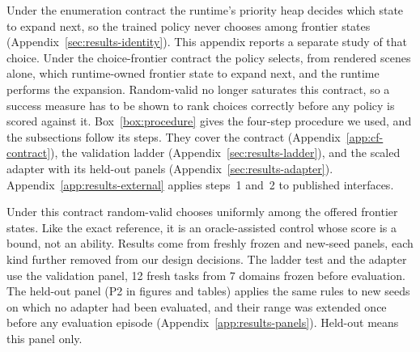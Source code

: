 Under the enumeration contract the runtime's priority heap decides which state to expand next, so the trained policy never chooses among frontier states (Appendix~\ref{sec:results-identity}). This appendix reports a separate study of that choice. Under the choice-frontier contract the policy selects, from rendered scenes alone, which runtime-owned frontier state to expand next, and the runtime performs the expansion. Random-valid no longer saturates this contract, so a success measure has to be shown to rank choices correctly before any policy is scored against it. Box~\ref{box:procedure} gives the four-step procedure we used, and the subsections follow its steps. They cover the contract (Appendix~\ref{app:cf-contract}), the validation ladder (Appendix~\ref{sec:results-ladder}), and the scaled adapter with its held-out panels (Appendix~\ref{sec:results-adapter}). Appendix~\ref{app:results-external} applies steps~1 and~2 to published interfaces.

Under this contract random-valid chooses uniformly among the offered frontier states. Like the exact reference, it is an oracle-assisted control whose score is a bound, not an ability. Results come from freshly frozen and new-seed panels, each kind further removed from our design decisions. The ladder test and the adapter use the validation panel, 12 fresh tasks from 7 domains frozen before evaluation. The held-out panel (P2 in figures and tables) applies the same rules to new seeds on which no adapter had been evaluated, and their range was extended once before any evaluation episode (Appendix~\ref{app:results-panels}). Held-out means this panel only.

